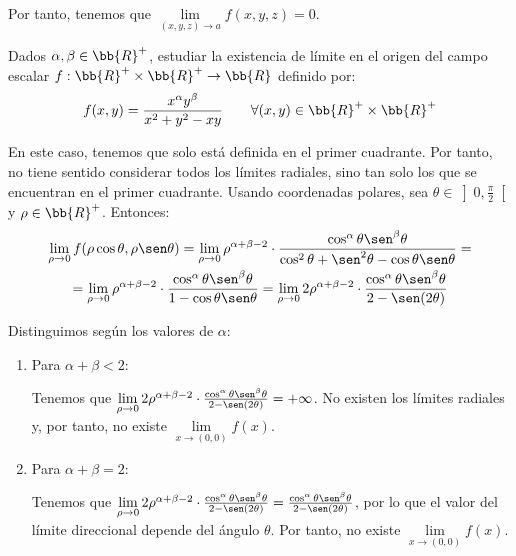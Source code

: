 \begin{ejercicio}
\begin{enumerate}
         Por tanto, tenemos que $\lim\limits_{(x,y,z)\to a}f(x,y,z)=0$.
    \end{enumerate}
\end{ejercicio}


\begin{ejercicio}
    Dados $\alpha, \beta \in \bb{R}^+$, estudiar la existencia de límite en el origen del campo escalar $f : \bb{R}^+\times \bb{R}^+ \to \bb{R}$ definido por:
    \begin{equation*}
        f(x,y) = \frac{x^\alpha y^\beta}{x^2+y^2-xy} \qquad \forall (x,y)\in \bb{R}^+\times \bb{R}^+
    \end{equation*}

    En este caso, tenemos que solo está definida en el primer cuadrante. Por tanto, no tiene sentido considerar todos los límites radiales, sino tan solo los que se encuentran en el primer cuadrante. Usando coordenadas polares, sea $\theta \in \left]0,\frac{\pi}{2}\right[$ y $\rho\in \bb{R}^+$. Entonces:
    \begin{multline*}
        \lim_{\rho\to 0}f(\rho \cos \theta, \rho \sen \theta)
        = \lim_{\rho\to 0} \rho^{\alpha+\beta-2} \cdot \frac{\cos^\alpha\theta \sen^\beta\theta}{\cos^2\theta +\sen^2\theta -\cos\theta \sen\theta}
        =\\= \lim_{\rho\to 0} \rho^{\alpha+\beta-2} \cdot \frac{\cos^\alpha\theta \sen^\beta\theta}{1 -\cos\theta \sen\theta}
        =
        \lim_{\rho\to 0} 2\rho^{\alpha+\beta-2} \cdot \frac{\cos^\alpha\theta \sen^\beta\theta}{2 -\sen(2\theta)}
    \end{multline*}

    Distinguimos según los valores de $\alpha$:
    \begin{enumerate}
        \item Para $\alpha+\beta<2$:

        Tenemos que $\lim\limits_{\rho\to 0} 2\rho^{\alpha+\beta-2} \cdot \frac{\cos^\alpha\theta \sen^\beta\theta}{2 -\sen(2\theta)}=+ \infty$. No existen los límites radiales y, por tanto, no existe $\lim\limits_{x\to (0,0)} f(x)$.

        \item Para $\alpha+\beta=2$:

        Tenemos que $\lim\limits_{\rho\to 0} 2\rho^{\alpha+\beta-2} \cdot \frac{\cos^\alpha\theta \sen^\beta\theta}{2 -\sen(2\theta)}=\frac{\cos^\alpha\theta \sen^\beta\theta}{2 -\sen(2\theta)}$, por lo que el valor del límite direccional depende del ángulo $\theta$. Por tanto, no existe $\lim\limits_{x\to (0,0)} f(x)$.


\end{enumerate}
\end{ejercicio}
